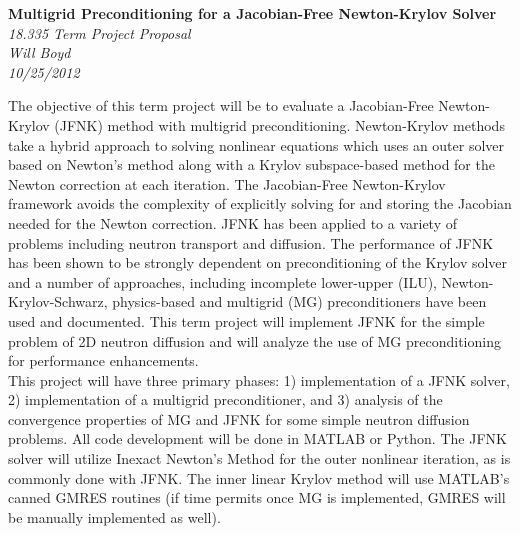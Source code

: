 \documentclass{article}
\begin{document}
\begin{center}

{\bfseries\huge Multigrid Preconditioning for a Jacobian-Free Newton-Krylov Solver}\\[0.5cm]

\emph{\large{18.335 Term Project Proposal}} \\
\emph{\large{Will Boyd}} \\
\emph{\large{10/25/2012}}

\bigskip

\emph{}

\end{center}



    The objective of this term project will be to evaluate a Jacobian-Free Newton-Krylov (JFNK) method with multigrid preconditioning. Newton-Krylov methods take a hybrid approach to solving nonlinear equations which uses an outer solver based on Newton's method along with a Krylov subspace-based method for the Newton correction at each iteration\cite{knoll:2004}. The Jacobian-Free Newton-Krylov framework avoids the complexity of explicitly solving for and storing the Jacobian needed for the Newton correction. JFNK has been applied to a variety of problems including neutron transport and diffusion\cite{gill:2009}. The performance of JFNK has been shown to be strongly dependent on preconditioning of the Krylov solver and a number of approaches, including incomplete lower-upper (ILU), Newton-Krylov-Schwarz, physics-based and multigrid (MG) preconditioners have been used and documented\cite{knoll:2004}. This term project will implement JFNK for the simple problem of 2D neutron diffusion and will analyze the use of MG preconditioning for performance enhancements. \\

    This project will have three primary phases: 1) implementation of a JFNK solver, 2) implementation of a multigrid preconditioner, and 3) analysis of the convergence properties of MG and JFNK for some simple neutron diffusion problems. All code development will be done in MATLAB or Python. The JFNK solver will utilize Inexact Newton's Method\cite{dembo:1982} for the outer nonlinear iteration, as is commonly done with JFNK\cite{knoll:2004}. The inner linear Krylov method will use MATLAB's canned GMRES routines (if time permits once MG is implemented, GMRES will be manually implemented as well). \\
\end{document}
